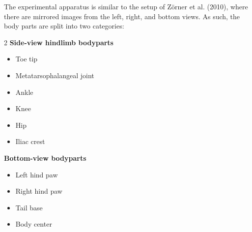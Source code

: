 \documentclass[11pt]{article}
\renewcommand{\[}{%
  \par\smallskip\noindent
  \begin{center}%
  \setlength{\fboxsep}{5pt}%
  \setlength{\fboxrule}{0.35pt}%
  \begin{lrbox}{\almaEquationBox}%
  $\displaystyle
}
\renewcommand{\]}{%
  $%
  \end{lrbox}%
  \fcolorbox{equationLine}{equationBack}{\usebox{\almaEquationBox}}%
  \end{center}%
  \smallskip\par
}
\begin{document}
The experimental apparatus is similar to the setup of Zörner et al. (2010), where there are mirrored images from the left, right, and bottom views. As such, the body parts are split into two categories:

\begin{tcolorbox}[blue table box,title=\textbf{Recommended Bodyparts}]
\begin{multicols}{2}
\textbf{Side-view hindlimb bodyparts}
\begin{itemize}
    \item Toe tip
    \item Metatarsophalangeal joint
    \item Ankle
    \item Knee
    \item Hip
    \item Iliac crest
\end{itemize}

\columnbreak

\textbf{Bottom-view bodyparts}
\begin{itemize}
    \item Left hind paw
    \item Right hind paw
    \item Tail base
    \item Body center
\end{itemize}
\end{multicols}
\end{tcolorbox}
\end{document}
